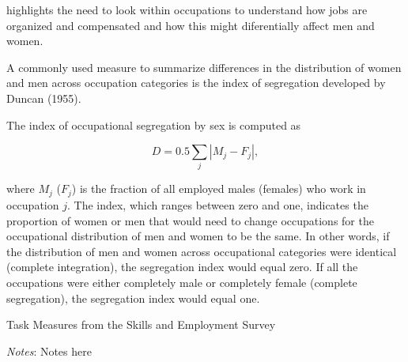 \textcite{goldinGrandGenderConvergence2014a} highlights the need to look within occupations
to understand how jobs are organized and compensated and how this might diferentially affect men and
women. 

A commonly used measure to summarize differences in the distribution of women and men across occupation categories 
is the index of segregation developed by Duncan (1955). 

The index of occupational segregation by sex is computed as

\begin{equation}
    D = 0.5 \sum_j |M_j - F_j|,
\end{equation}

where $M_j$ ($F_j$) is the fraction of all employed males (females) who work in occupation $j$. 
The index, which ranges between zero and one, indicates the proportion of women or men that would need 
to change occupations for the occupational distribution of men and women to be the same. In other words, 
if the distribution of men and women across occupational categories were identical (complete integration), 
the segregation index would equal zero. If all the occupations were either completely male or completely female 
(complete segregation), the segregation index would equal one.


\begin{table}[!t]
    \centering
    \caption{Task Measures from the Skills and Employment Survey}
    \label{tab:label}
    \begin{threeparttable}
        
        \begin{tablenotes}[flushleft]
            \scriptsize{\item \textit{Notes}: Notes here}
        \end{tablenotes}
    \end{threeparttable}
\end{table}